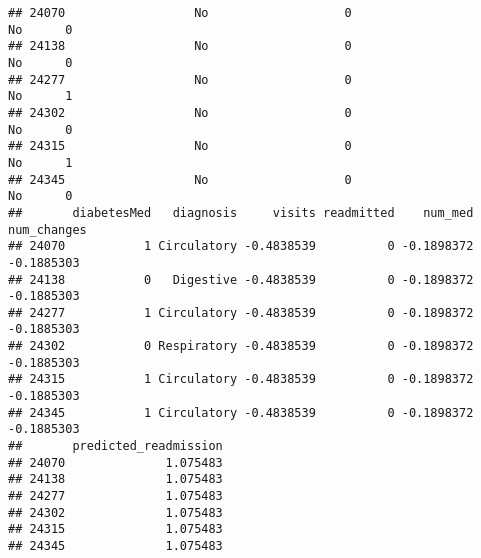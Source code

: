 \documentclass[
]{article}
\newenvironment{Shaded}{\begin{snugshade}}{\end{snugshade}}
\newcommand{\AttributeTok}[1]{\textcolor[rgb]{0.13,0.29,0.53}{#1}}
\newcommand{\DecValTok}[1]{\textcolor[rgb]{0.00,0.00,0.81}{#1}}
\newcommand{\DocumentationTok}[1]{\textcolor[rgb]{0.56,0.35,0.01}{\textbf{\textit{#1}}}}
\newcommand{\FunctionTok}[1]{\textcolor[rgb]{0.13,0.29,0.53}{\textbf{#1}}}
\newcommand{\NormalTok}[1]{#1}
\newcommand{\OtherTok}[1]{\textcolor[rgb]{0.56,0.35,0.01}{#1}}
\newcommand{\SpecialCharTok}[1]{\textcolor[rgb]{0.81,0.36,0.00}{\textbf{#1}}}
\begin{document}
\begin{verbatim}
## 24070                  No                   0                     No      0
## 24138                  No                   0                     No      0
## 24277                  No                   0                     No      1
## 24302                  No                   0                     No      0
## 24315                  No                   0                     No      1
## 24345                  No                   0                     No      0
##       diabetesMed   diagnosis     visits readmitted    num_med num_changes
## 24070           1 Circulatory -0.4838539          0 -0.1898372  -0.1885303
## 24138           0   Digestive -0.4838539          0 -0.1898372  -0.1885303
## 24277           1 Circulatory -0.4838539          0 -0.1898372  -0.1885303
## 24302           0 Respiratory -0.4838539          0 -0.1898372  -0.1885303
## 24315           1 Circulatory -0.4838539          0 -0.1898372  -0.1885303
## 24345           1 Circulatory -0.4838539          0 -0.1898372  -0.1885303
##       predicted_readmission
## 24070              1.075483
## 24138              1.075483
## 24277              1.075483
## 24302              1.075483
## 24315              1.075483
## 24345              1.075483
\end{verbatim}

\begin{Shaded}
\end{Shaded}
\end{document}
